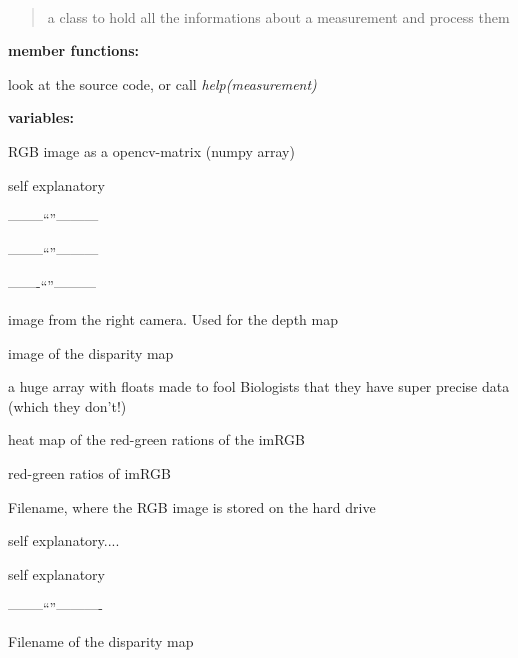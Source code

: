 \documentclass[a4paper,10pt,openany,oneside]{sphinxmanual}
\begin{document}
\begin{fulllineitems}
\label{index:scripts.measurement.measurement}~\begin{quote}

a class to hold all the informations about a measurement and process them
\end{quote}

\begin{DUlineblock}{0em}
\item[] \textbf{member functions:}
\item[]
\begin{DUlineblock}{\DUlineblockindent}
\item[] look at the source code, or call \emph{help(measurement)}
\end{DUlineblock}
\item[] \textbf{variables:}
\item[]
\begin{DUlineblock}{\DUlineblockindent}
\item[]          RGB image as a opencv-matrix (numpy array)
\item[]          self explanatory
\item[]           --------``''---------
\item[]         --------``''---------
\item[]             -------``''---------
\item[]       image from the right camera. Used for the depth map
\item[]           image of the disparity map
\item[]     a huge array with floats made to fool Biologists that they
have super precise data (which they don't!)
\item[]             heat map of the red-green rations of the imRGB
\item[]          red-green ratios of imRGB
\item[]     Filename, where the RGB image is stored on the hard drive
\item[]     self explanatory....
\item[]      self explanatory
\item[]   --------``''----------
\item[]    Filename of the disparity map

\end{DUlineblock}
\end{DUlineblock}
\end{fulllineitems}
\end{document}
